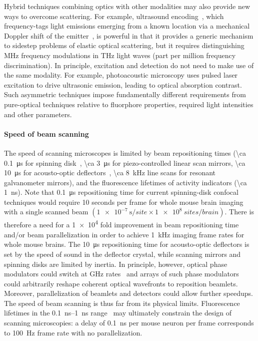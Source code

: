 Hybrid techniques combining optics with other modalities may also provide new ways to overcome scattering.
For example, ultrasound encoding~\cite{wang12}, which frequency-tags light emissions emerging from a known location via a mechanical Doppler shift of the emitter~\cite{mahan98}, is powerful in that it provides a generic mechanism to sidestep problems of elastic optical scattering, but it requires distinguishing MHz frequency modulations in THz light waves (part per million frequency discrimination). In principle, excitation and detection do not need to make use of the same modality. For example, photoacoustic microscopy \cite{filonov12} uses pulsed laser excitation to drive ultrasonic emission, leading to optical absorption contrast. Such asymmetric techniques impose fundamentally different requirements from pure-optical techniques relative to fluorphore properties, required light intensities and other parameters.

\paragraph{Speed of beam scanning}
The speed of scanning microscopes is limited by beam repositioning times (\SI{\ca 0.1}{\micro\second} for spinning disk~\cite{mahalati13,kang10,flusberg05}, \SI{\ca 3}{\micro\second} for piezo-controlled linear scan mirrors, \SI{\ca 10}{\micro\second} for acousto-optic deflectors~\cite{vucinic07}, \SI{\ca 8}{\kilo\hertz} line scans for resonant galvanometer mirrors), and the fluorescence lifetimes of activity indicators (\SI{\ca 1}{\nano\second}).
Note that \SI{0.1}{\micro\second} repositioning time for current spinning-disk confocal techniques would require 10 seconds per frame for whole mouse brain imaging with a single scanned beam $\left(\SI{1e-7}{\second\per site}\times\SI{1e8}{sites\per brain}\right)$. There is therefore a need for a \num{1e4} fold improvement in beam repositioning time and/or beam parallelization in order to achieve \SI{1}{\kilo\hertz} imaging frame rates for whole mouse brains.
The \SI{10}{\micro\second} repositioning time for acousto-optic deflectors is set by the speed of sound in the deflector crystal, while scanning mirrors and spinning disks are limited by inertia.
In principle, however, optical phase modulators could switch at GHz rates~\cite{alivisatos13} and arrays of such phase modulators could arbitrarily reshape coherent optical wavefronts to reposition beamlets.
Moreover, parallelization of beamlets and detectors could allow further speedups.
The speed of beam scanning is thus far from its physical limits.
Fluorescence lifetimes in the \SIrange{0.1}{1}{\nano\second} range~\cite{striker99} may ultimately constrain the design of scanning microscopies: a delay of \SI{0.1}{\nano\second} per mouse neuron per frame corresponds to \SI{100}{\hertz} frame rate with no parallelization.

